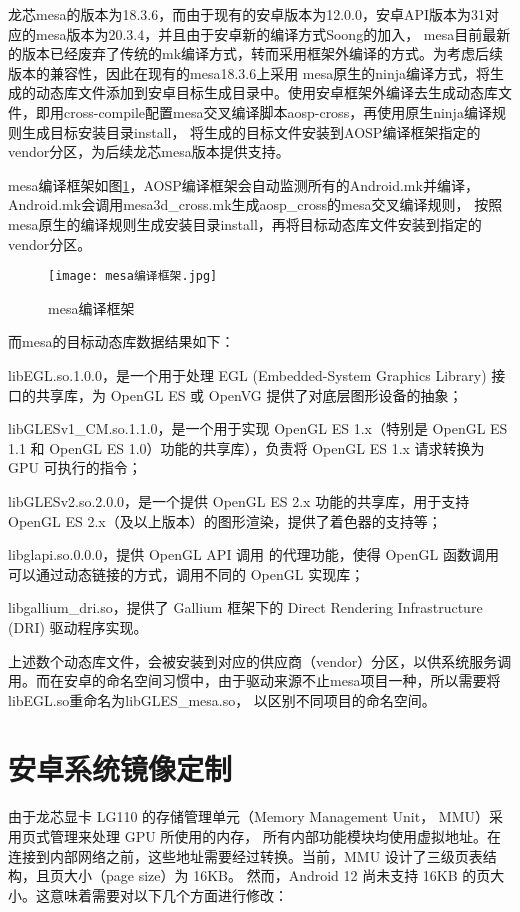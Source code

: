 龙芯mesa的版本为18.3.6，而由于现有的安卓版本为12.0.0，安卓API版本为31对应的mesa版本为20.3.4，并且由于安卓新的编译方式Soong的加入，
mesa目前最新的版本已经废弃了传统的mk编译方式，转而采用框架外编译的方式。为考虑后续版本的兼容性，因此在现有的mesa18.3.6上采用
mesa原生的ninja编译方式，将生成的动态库文件添加到安卓目标生成目录中。使用安卓框架外编译去生成动态库文件，即用cross-compile配置mesa交叉编译脚本aosp-cross，再使用原生ninja编译规则生成目标安装目录install，
将生成的目标文件安装到AOSP编译框架指定的vendor分区，为后续龙芯mesa版本提供支持。

mesa编译框架如图\ref{fig:mesa编译框架}，AOSP编译框架会自动监测所有的Android.mk并编译，Android.mk会调用mesa3d\_cross.mk生成aosp\_cross的mesa交叉编译规则，
按照mesa原生的编译规则生成安装目录install，再将目标动态库文件安装到指定的vendor分区。
\begin{figure}[h]
  \centering
  \texttt{[image: mesa编译框架.jpg]}
  \caption{mesa编译框架}
  \label{fig:mesa编译框架}
\end{figure}

而mesa的目标动态库数据结果如下：

libEGL.so.1.0.0，是一个用于处理 EGL (Embedded-System Graphics Library) 接口的共享库，为 OpenGL ES 或 OpenVG 提供了对底层图形设备的抽象；

libGLESv1\_CM.so.1.1.0，是一个用于实现 OpenGL ES 1.x（特别是 OpenGL ES 1.1 和 OpenGL ES 1.0）功能的共享库），负责将 OpenGL ES 1.x 请求转换为 GPU 可执行的指令；

libGLESv2.so.2.0.0，是一个提供 OpenGL ES 2.x 功能的共享库，用于支持 OpenGL ES 2.x（及以上版本）的图形渲染，提供了着色器的支持等；

libglapi.so.0.0.0，提供 OpenGL API 调用 的代理功能，使得 OpenGL 函数调用可以通过动态链接的方式，调用不同的 OpenGL 实现库；

libgallium\_dri.so，提供了 Gallium 框架下的 Direct Rendering Infrastructure (DRI) 驱动程序实现。

上述数个动态库文件，会被安装到对应的供应商（vendor）分区，以供系统服务调用。而在安卓的命名空间习惯中，由于驱动来源不止mesa项目一种，所以需要将libEGL.so重命名为libGLES\_mesa.so，
以区别不同项目的命名空间。

\section{安卓系统镜像定制}
由于龙芯显卡 LG110 的存储管理单元（Memory Management Unit， MMU）采用页式管理来处理 GPU 所使用的内存，
所有内部功能模块均使用虚拟地址。在连接到内部网络之前，这些地址需要经过转换。当前，MMU 设计了三级页表结构，且页大小（page size）为 16KB。
然而，Android 12 尚未支持 16KB 的页大小。这意味着需要对以下几个方面进行修改：

